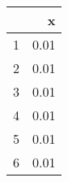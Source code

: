 \begin{table}[ht]
\begin{center}
\begin{tabular}{rr}
  \hline
 & x \\ 
  \hline
1 & 0.01 \\ 
  2 & 0.01 \\ 
  3 & 0.01 \\ 
  4 & 0.01 \\ 
  5 & 0.01 \\ 
  6 & 0.01 \\ 
   \hline
\end{tabular}
\end{center}
\end{table}
